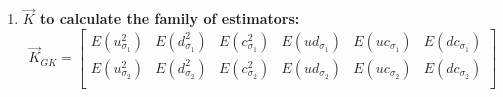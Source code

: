 \documentclass[12pt]{article}   	%
\begin{document}
\begin{enumerate}
\item \textbf{$\vec{K}$ to calculate the family of estimators:}\\
$$\vec{K}_{GK}=
\begin{bmatrix}
E(u_{\sigma_1}^2)& E(d_{\sigma_1}^2)& E(c_{\sigma_1}^2)&E(ud_{\sigma_1})&E(uc_{\sigma_1})&E(dc_{\sigma_1})\\
E(u_{\sigma_2}^2)& E(d_{\sigma_2}^2)& E(c_{\sigma_2}^2)&E(ud_{\sigma_2})&E(uc_{\sigma_2})&E(dc_{\sigma_2})\\

\end{bmatrix}$$
\end{enumerate}
\end{document}
